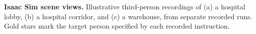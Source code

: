 \textbf{Isaac Sim scene views.}
Illustrative third-person recordings of (a) a hospital lobby,
(b) a hospital corridor, and (c) a warehouse, from separate recorded runs.
Gold stars mark the target person specified by each recorded instruction.
